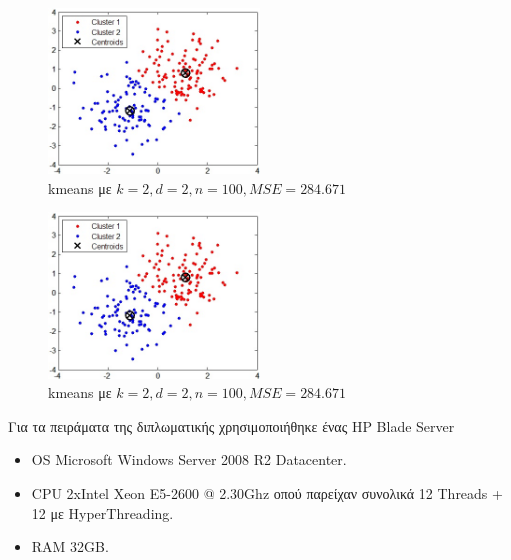 \begin{figure}[ht!]
  \centering
  \includegraphics[width=0.5\textwidth]{chapter3/kmeans.jpg}
  \caption{kmeans με $k=2,d=2,n=100,MSE=284.671$}
  \label{fig:fastnn}
\end{figure}

\begin{figure}[ht!]
  \centering
  \includegraphics[width=0.5\textwidth]{chapter3/kmeans.jpg}
  \caption{kmeans με $k=2,d=2,n=100,MSE=284.671$}
  \label{fig:ompiter}
\end{figure}

\newpage
\indent Για τα πειράματα της διπλωματικής χρησιμοποιήθηκε ένας HP Blade Server
\begin{itemize}
    \item OS Microsoft Windows Server 2008 R2 Datacenter.
    \item CPU 2xIntel Xeon E5-2600 @ 2.30Ghz οπού παρείχαν συνολικά 12 Threads + 12 με HyperThreading.
    \item RAM 32GB.
\end{itemize} 